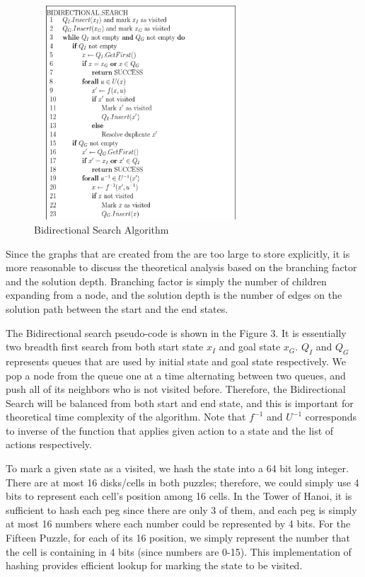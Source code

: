 \documentclass[conference]{IEEEtran}
\begin{document}
\begin{figure}[!t]
\includegraphics[width=8cm, height=8cm]{BI_Pseudocode}
\centering
\caption{Bidirectional Search Algorithm}
\end{figure}

Since the graphs that are created from the are too large to store explicitly, it is more reasonable to discuss the theoretical analysis based on the branching factor and the solution depth. Branching factor is simply the number of children expanding from a node, and the solution depth is the number of edges on the solution path between the start and the end states.

The Bidirectional search pseudo-code is shown in the Figure 3. It is essentially two breadth first search from both start state $x_I$ and goal state $x_G$. $Q_I$ and $Q_G$ represents queues that are used by initial state and goal state respectively. We pop a node from the queue one at a time alternating between two queues, and push all of its neighbors who is not visited before. Therefore, the Bidirectional Search will be balanced from both start and end state, and this is important for theoretical time complexity of the algorithm. Note that $f^{-1}$ and $U^{-1}$ corresponds to inverse of the function that applies given action to a state and the list of actions respectively.

To mark a given state as a visited, we hash the state into a 64 bit long integer. There are at most 16 disks/cells in both puzzles; therefore, we could simply use 4 bits to represent each cell's position among 16 cells. In the Tower of Hanoi, it is sufficient to hash each peg since there are only 3 of them, and each peg is simply at most 16 numbers where each number could be represented by 4 bits. For the Fifteen Puzzle, for each of its 16 position, we simply represent the number that the cell is containing in 4 bits (since numbers are 0-15). This implementation of hashing provides efficient lookup for marking the state to be visited.
\end{document}
